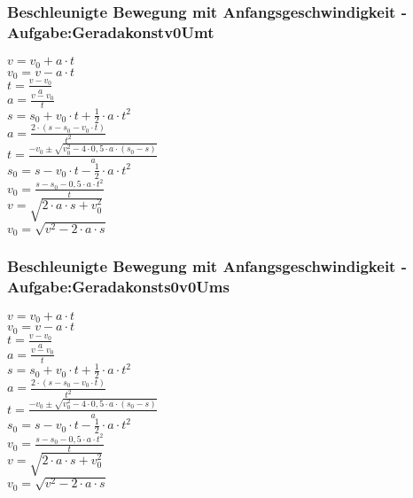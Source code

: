 \subsubsection{Beschleunigte Bewegung mit Anfangsgeschwindigkeit - Aufgabe:Geradakonstv0Umt} 
\begin{minipage}{0.45\textwidth} 
$ v = v_{0}  + a\cdot t $\\ 
$ v_{0}  = v - a\cdot t $\\ 
$ t = \frac{v - v_{0} }{a} $\\ 
$ a = \frac{v - v_{0} }{  t} $\\ 
$ s = s_{0}  + v_{0} \cdot t + \frac{1}{2}\cdot a\cdot t^{2} $\\ 
$ a = \frac{2\cdot (s - s_{0}  - v_{0} \cdot t)}{     t^{2} } $\\ 
$ t = \frac{-v_{0}  \pm \sqrt{v_{0} ^{2} -4\cdot 0,5\cdot a\cdot (s_{0}  -s)}}{       a} $\\ 
$ s_{0}  = s - v_{0} \cdot t - \frac{1}{2}\cdot a\cdot t^{2} $\\ 
$ v_{0}  =\frac{s-s_{0} -0,5\cdot a\cdot t^{2} }{    t} $\\ 
$ v  =\sqrt{2\cdot a \cdot s+ v_{0}^2} $\\ 
$ v_{0}  =\sqrt{v^2-2\cdot a \cdot s} $\\ 
\end{minipage} 
\begin{minipage}{0.45\textwidth} 
 
\end{minipage} 
\subsubsection{Beschleunigte Bewegung mit Anfangsgeschwindigkeit - Aufgabe:Geradakonsts0v0Ums} 
\begin{minipage}{0.45\textwidth} 
$ v = v_{0}  + a\cdot t $\\ 
$ v_{0}  = v - a\cdot t $\\ 
$ t = \frac{v - v_{0} }{a} $\\ 
$ a = \frac{v - v_{0} }{  t} $\\ 
$ s = s_{0}  + v_{0} \cdot t + \frac{1}{2}\cdot a\cdot t^{2} $\\ 
$ a = \frac{2\cdot (s - s_{0}  - v_{0} \cdot t)}{     t^{2} } $\\ 
$ t = \frac{-v_{0}  \pm \sqrt{v_{0} ^{2} -4\cdot 0,5\cdot a\cdot (s_{0}  -s)}}{       a} $\\ 
$ s_{0}  = s - v_{0} \cdot t - \frac{1}{2}\cdot a\cdot t^{2} $\\ 
$ v_{0}  =\frac{s-s_{0} -0,5\cdot a\cdot t^{2} }{    t} $\\ 
$ v  =\sqrt{2\cdot a \cdot s+ v_{0}^2} $\\ 
$ v_{0}  =\sqrt{v^2-2\cdot a \cdot s} $\\ 
\end{minipage} 
\begin{minipage}{0.45\textwidth} 
 
\end{minipage} 
